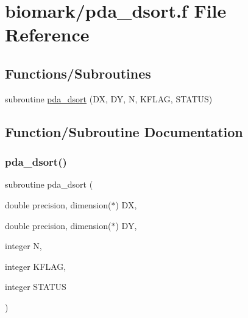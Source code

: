 \hypertarget{pda__dsort_8f}{}\section{biomark/pda\+\_\+dsort.f File Reference}
\label{pda__dsort_8f}
\subsection*{Functions/\+Subroutines}
\begin{DoxyCompactItemize}
\item 
subroutine \hyperlink{pda__dsort_8f_abe837e619ea8ad96a5acd23b4b202ae7}{pda\+\_\+dsort} (DX, DY, N, K\+F\+L\+AG, S\+T\+A\+T\+US)
\end{DoxyCompactItemize}


\subsection{Function/\+Subroutine Documentation}
\mbox{\label{pda__dsort_8f_abe837e619ea8ad96a5acd23b4b202ae7}} 
\subsubsection{\texorpdfstring{pda\+\_\+dsort()}{pda\_dsort()}}
{\footnotesize\ttfamily subroutine pda\+\_\+dsort (\begin{DoxyParamCaption}\item[{double precision, dimension($\ast$)}]{DX,  }\item[{double precision, dimension($\ast$)}]{DY,  }\item[{integer}]{N,  }\item[{integer}]{K\+F\+L\+AG,  }\item[{integer}]{S\+T\+A\+T\+US }\end{DoxyParamCaption})}

